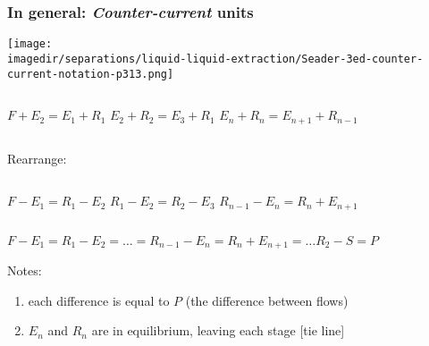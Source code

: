 \begin{frame}\frametitle{In general: \emph{Counter-current} units}
	\begin{center}
		\texttt{[image: \\imagedir/separations/liquid-liquid-extraction/Seader-3ed-counter-current-notation-p313.png]}
	\end{center}
		\begin{center}
			\begin{columns}[t]
					\small $F + E_2 = E_1 + R_1$
					\small $E_2 + R_2 = E_3 + R_1$
					\small $E_n + R_n = E_{n+1} + R_{n-1}$
			\end{columns}
		\end{center}
		\vspace{-12pt}
		Rearrange:
		\begin{center}		
			\begin{columns}[t]
					\small $F - E_1 = R_1 - E_2$
					\small $R_1 - E_2 = R_2 - E_3$
					\small $R_{n-1} - E_n = R_{n} + E_{n+1}$
			\end{columns}
			\vspace{12pt}
			$F - E_1  =  R_1 - E_2 = \ldots = R_{n-1} - E_n = R_{n} + E_{n+1} = \ldots R_2 - S = P$
		\end{center}
		Notes:
		\begin{enumerate}
			\item	each difference is equal to $P$ (the difference between flows)
			\item	$E_n$ and $R_{n}$ are in equilibrium, leaving each stage [tie line]
		\end{enumerate} 
\end{frame}

